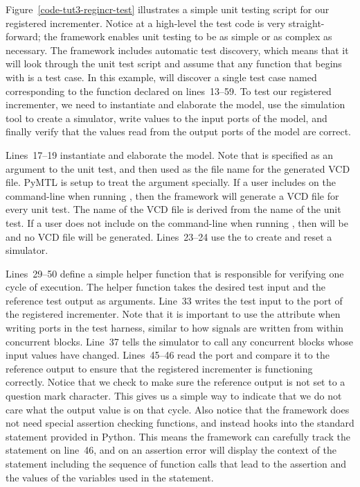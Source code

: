 \documentclass{cbxdoc}
\begin{document}


Figure~\ref{code-tut3-regincr-test} illustrates a simple unit testing
script for our registered incrementer. Notice at a high-level the test
code is very straight-forward; the  framework enables unit
testing to be as simple or as complex as necessary. The 
framework includes automatic test discovery, which means that it will
look through the unit test script and assume that any function that
begins with  is a test case. In this example, 
will discover a single test case named  corresponding to
the function declared on lines~13--59. To test our registered
incrementer, we need to instantiate and elaborate the model, use the
simulation tool to create a simulator, write values to the input ports of
the model, and finally verify that the values read from the output
ports of the model are correct.

Lines~17--19 instantiate and elaborate the model. Note that
 is specified as an argument to the unit test, and then
used as the file name for the generated VCD file. PyMTL is setup to treat
the  argument specially. If a user includes
 on the command-line when running , then the
framework will generate a VCD file for every unit test. The name of the
VCD file is derived from the name of the unit test. If a user does not
include  on the command-line when running ,
then  will be  and no VCD file will be generated.
Lines~23--24 use the  to create and reset a
simulator.

Lines~29--50 define a simple helper function that is responsible for
verifying one cycle of execution. The helper function takes the desired
test input and the reference test output as arguments. Line~33 writes the
test input to the  port of the registered incrementer. Note that
it is important to use the  attribute when writing ports in the
test harness, similar to how signals are written from within
 concurrent blocks. Line~37 tells the simulator to
call any  concurrent blocks whose input values have
changed. Lines~45--46 read the  port and compare it to the
reference output to ensure that the registered incrementer is functioning
correctly. Notice that we check to make sure the reference output is not
set to a question mark character. This gives us a simple way to indicate
that we do not care what the output value is on that cycle. Also notice
that the  framework does not need special assertion checking
functions, and instead hooks into the standard  statement
provided in Python. This means the  framework can carefully
track the  statement on line~46, and on an assertion error
will display the context of the  statement including the
sequence of function calls that lead to the assertion and the values of
the variables used in the  statement.
\end{document}
